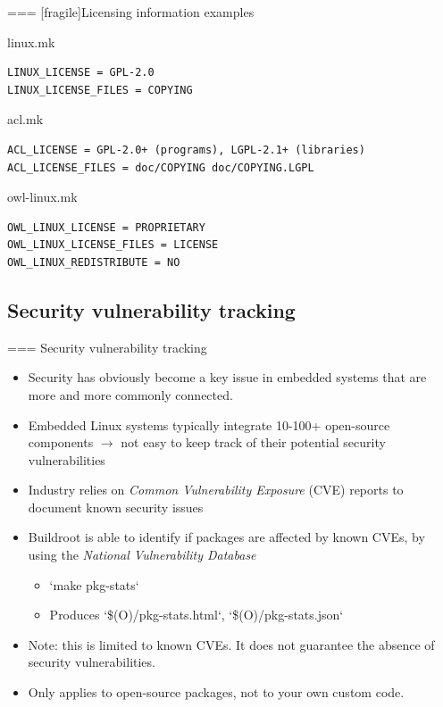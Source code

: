 === [fragile]{Licensing information examples}
  \begin{block}{linux.mk}
\begin{verbatim}
LINUX_LICENSE = GPL-2.0
LINUX_LICENSE_FILES = COPYING
\end{verbatim}
  \end{block}

\begin{block}{acl.mk}
\begin{verbatim}
ACL_LICENSE = GPL-2.0+ (programs), LGPL-2.1+ (libraries)
ACL_LICENSE_FILES = doc/COPYING doc/COPYING.LGPL
\end{verbatim}
\end{block}

\begin{block}{owl-linux.mk}
\begin{verbatim}
OWL_LINUX_LICENSE = PROPRIETARY
OWL_LINUX_LICENSE_FILES = LICENSE
OWL_LINUX_REDISTRIBUTE = NO
\end{verbatim}
\end{block}



\subsection{Security vulnerability tracking}

=== {Security vulnerability tracking}
  \begin{itemize}
  \item Security has obviously become a key issue in embedded systems
    that are more and more commonly connected.
  \item Embedded Linux systems typically integrate 10-100+ open-source
    components $\rightarrow$ not easy to keep track of their potential
    security vulnerabilities
  \item Industry relies on {\em Common Vulnerability Exposure} (CVE)
    reports to document known security issues
  \item Buildroot is able to identify if packages are affected by
    known CVEs, by using the {\em National Vulnerability Database}
    \begin{itemize}
    \item `make pkg-stats`
    \item Produces `\$(O)/pkg-stats.html`, `\$(O)/pkg-stats.json`
    \end{itemize}
  \item Note: this is limited to known CVEs. It does not guarantee the
    absence of security vulnerabilities.
  \item Only applies to open-source packages, not to your own custom
    code.
  \end{itemize}


